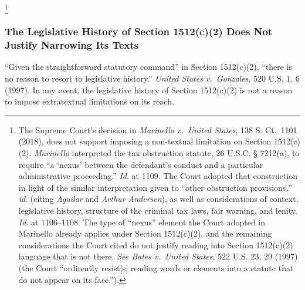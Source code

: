 \footnote{The Supreme Court’s decision in \textit{Marinello v.\ United States}, 138 S. Ct.~1101 (2018), does not support imposing a non-textual limitation on Section 1512(c)(2).
\textit{Marinello} interpreted the tax obstruction statute, 26 U.S.C. § 7212(a), to require “a ‘nexus’ between the defendant’s conduct and a particular administrative proceeding.”
\textit{Id}. at 1109.
The Court adopted that construction in light of the similar interpretation given to “other obstruction provisions,” \textit{id}. (citing \textit{Aguilar} and \textit{Arthur Andersen}), as well as considerations of context, legislative history, structure of the criminal tax laws, fair warning, and lenity.
\textit{Id}. at 1106--1108.
The type of “nexus” element the Court adopted in Marinello already applies under Section 1512(c)(2), and the remaining considerations the Court cited do not justify reading into Section 1512(c)(2) language that is not there.
\textit{See Bates v.\ United States}, 522 U.S. 23, 29 (1997) (the Court “ordinarily resist[s] reading words or elements into a statute that do not appear on its face.”).}

\subsubsection{The Legislative History of Section 1512(c)(2) Does Not Justify Narrowing Its Texts}

“Given the straightforward statutory command” in Section 1512(c)(2), “there is no reason to resort to legislative history.”
\textit{United States v.\ Gonzales}, 520 U.S. 1, 6 (1997).
In any event, the legislative history of Section 1512(c)(2) is not a reason to impose extratextual limitations on its reach.

